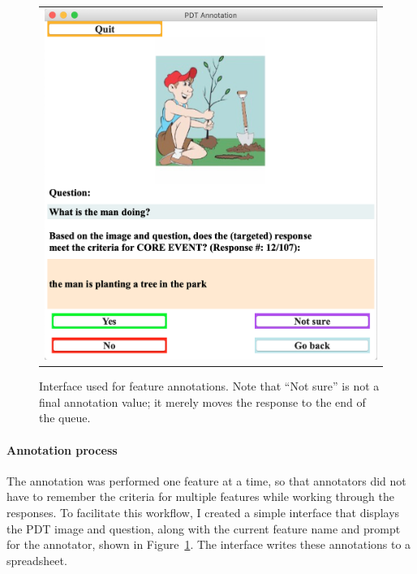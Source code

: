 \begin{figure}[htb!]
\begin{center}
\begin{tabular}{c}
\includegraphics[width=0.85\columnwidth]{figures/annotation_interface.jpg} \\
\end{tabular}
\caption{\label{fig:annotation-interface} Interface used for feature annotations. Note that ``Not sure'' is not a final annotation value; it merely moves the response to the end of the queue.}
\end{center}
\end{figure}



\paragraph{Annotation process}
The annotation was performed one feature at a time, so that annotators did not have to remember the criteria for multiple features while working through the responses. To facilitate this workflow, I created a simple interface that displays the PDT image and question, along with the current feature name and prompt for the annotator, shown in Figure~\ref{fig:annotation-interface}. The interface writes these annotations to a spreadsheet.

